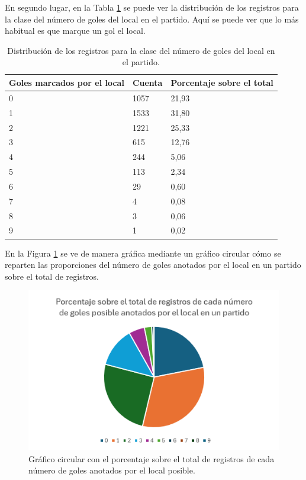 En segundo lugar, en la Tabla \ref{fig:distribucion-local} se puede ver la distribución de los registros para la clase del número de goles del local en el partido. Aquí se puede ver que lo más habitual es que marque un gol el local.
\begin{table}[]
    \centering
    \begin{tabular}{|l|l|l|}
    \hline
    \rowcolor[HTML]{C0C0C0} 
    Goles marcados por el local & Cuenta & Porcentaje sobre el total \\ \hline
    0     & 1057   & 21,93                     \\ \hline
    1            & 1533   & 31,80                     \\ \hline
    2 & 1221   & 25,33                     \\ \hline
    3 & 615   & 12,76                     \\ \hline
    4 & 244   & 5,06                    \\ \hline
    5 & 113   & 2,34                     \\ \hline
    6 & 29   & 0,60                     \\ \hline
    7 & 4   & 0,08                     \\ \hline
    8 & 3   & 0,06                     \\ \hline
    9 & 1   & 0,02                     \\ \hline
    \end{tabular}
    \caption{Distribución de los registros para la clase del número de goles del local en el partido. }
    \label{fig:distribucion-local}
\end{table}

En la Figura \ref{fig:distribucion-local} se ve de manera gráfica mediante un gráfico circular cómo se reparten las proporciones del número de goles anotados por el local en un partido sobre el total de registros.
\begin{figure}[H]
    \centering
    \includegraphics[scale=0.75]{svg/grafico-circular-local.png}
    \caption{Gráfico circular con el porcentaje sobre el total de registros de cada número de goles anotados por el local posible. }
    \label{fig:grafico-circular-local}
\end{figure}






